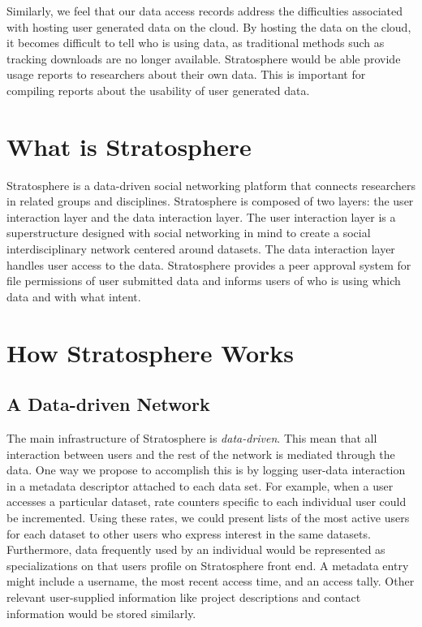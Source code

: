 \begin{multicols*}{2}
Similarly, we feel that our data access records address the
difficulties associated with hosting user generated data on the cloud.  By hosting
the data on the cloud, it becomes difficult to tell who is using data,
as traditional methods such as tracking downloads are no longer
available.  Stratosphere would be able provide usage reports to
researchers about their own data.  This is important for compiling
reports about the usability of user generated data.

\section{What is Stratosphere}
\label{sec:what}

Stratosphere is a data-driven social networking platform that connects
researchers in related groups and disciplines. Stratosphere is
composed of two layers: the user interaction layer and the data
interaction layer. The user interaction layer is a superstructure
designed with social networking in mind to create a social
interdisciplinary network centered around datasets. The data
interaction layer handles user access to the data. Stratosphere
provides a peer approval system for file permissions of user submitted
data and informs users of who is using which data and with what
intent.
\vspace{10pt}


\section{How Stratosphere Works}
\label{sec:how}

\subsection{A Data-driven Network}

The main infrastructure of Stratosphere is \emph{data-driven}. This
mean that all interaction between users and the rest of the network is
mediated through the data. One way we propose to accomplish this is by
logging user-data interaction in a metadata descriptor attached to
each data set. For example, when a user accesses a particular dataset,
rate counters specific to each individual user could be
incremented. Using these rates, we could present lists of the most
active users for each dataset to other users who express interest in
the same datasets. Furthermore, data frequently used by an individual
would be represented as specializations on that users profile on
Stratosphere front end. A metadata entry might include a username, the
most recent access time, and an access tally.  Other relevant
user-supplied information like project descriptions and contact
information would be stored similarly.



\end{multicols*}
